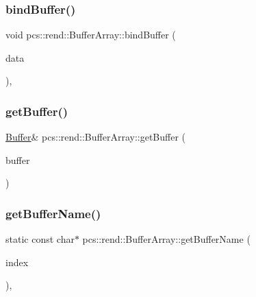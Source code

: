\subsubsection{\texorpdfstring{bind\+Buffer()}{bindBuffer()}\hspace{0.1cm}{\footnotesize\ttfamily [2/2]}}
{\footnotesize\ttfamily void pcs\+::rend\+::\+Buffer\+Array\+::bind\+Buffer (\begin{DoxyParamCaption}\item[{std\+::vector$<$ \hyperlink{structpcs_1_1Mat4f}{Mat4f} $>$ \&}]{data }\end{DoxyParamCaption})\hspace{0.3cm}{\ttfamily [inline]}, {\ttfamily [protected]}}

\mbox{\label{classpcs_1_1rend_1_1BufferArray_ad4b43fddb8e19fcaa6fbb8ff80a64a94}} 
\subsubsection{\texorpdfstring{get\+Buffer()}{getBuffer()}}
{\footnotesize\ttfamily \hyperlink{classpcs_1_1rend_1_1Buffer}{Buffer}\& pcs\+::rend\+::\+Buffer\+Array\+::get\+Buffer (\begin{DoxyParamCaption}\item[{\hyperlink{namespacepcs_1_1rend_a731e43a479c7b7b61dd23586494ee61b}{Buffer\+Index}}]{buffer }\end{DoxyParamCaption})\hspace{0.3cm}{\ttfamily [inline]}}

\mbox{\label{classpcs_1_1rend_1_1BufferArray_a7ed1705d18349b1e7a08b769f233546a}} 
\subsubsection{\texorpdfstring{get\+Buffer\+Name()}{getBufferName()}}
{\footnotesize\ttfamily static const char$\ast$ pcs\+::rend\+::\+Buffer\+Array\+::get\+Buffer\+Name (\begin{DoxyParamCaption}\item[{unsigned int}]{index }\end{DoxyParamCaption})\hspace{0.3cm}{\ttfamily [inline]}, {\ttfamily [static]}}

